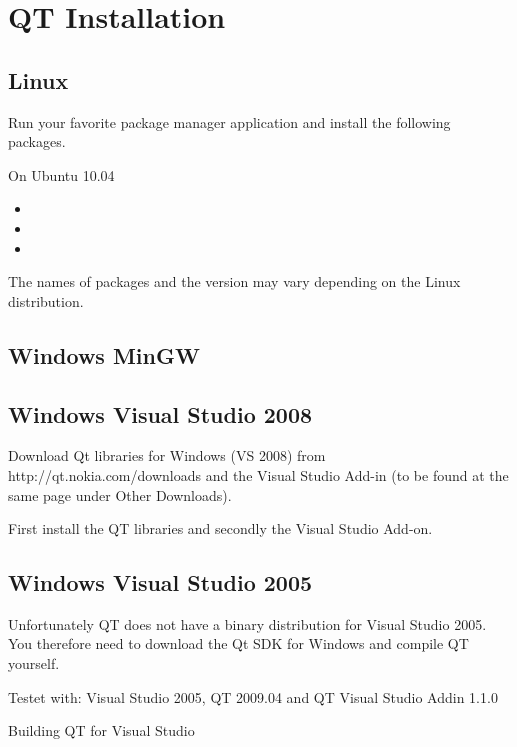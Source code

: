 \section{QT Installation}

\subsection{Linux}
Run your favorite package manager application and install the following packages.

On Ubuntu 10.04
\begin{itemize}
\item
\item 
\item
\end{itemize}
The names of packages and the version may vary depending on the Linux distribution.


\subsection{Windows MinGW}

\subsection{Windows Visual Studio 2008}
Download Qt libraries for Windows (VS 2008) from http://qt.nokia.com/downloads and the Visual Studio Add-in (to be found at the same page under Other Downloads).

First install the QT libraries and secondly the Visual Studio Add-on.

\subsection{Windows Visual Studio 2005}
Unfortunately QT does not have a binary distribution for Visual Studio 2005. You therefore need to download the Qt SDK for Windows and compile QT yourself. 

Testet with:  Visual Studio 2005, QT 2009.04 and QT Visual Studio Addin 1.1.0

Building QT for Visual Studio

